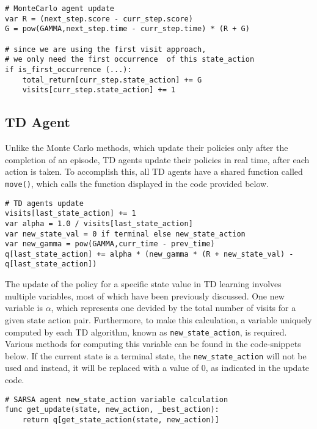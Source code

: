 \begin{center}
\hrulefill
\begin{lstlisting}
# MonteCarlo agent update
var R = (next_step.score - curr_step.score)
G = pow(GAMMA,next_step.time - curr_step.time) * (R + G)
            
# since we are using the first visit approach,
# we only need the first occurrence  of this state_action
if is_first_occurrence (...):
    total_return[curr_step.state_action] += G
    visits[curr_step.state_action] += 1
\end{lstlisting}
\hrulefill
\end{center}

\subsection{TD Agent}	
Unlike the Monte Carlo methods, which update their policies only after the completion of an episode, TD agents update their policies in real time, after each action is taken. To accomplish this, all TD agents have a shared function called \texttt{move()}, which calls the function displayed in the code provided below. 

\begin{center}
\hrulefill
\begin{lstlisting}
# TD agents update
visits[last_state_action] += 1
var alpha = 1.0 / visits[last_state_action]
var new_state_val = 0 if terminal else new_state_action
var new_gamma = pow(GAMMA,curr_time - prev_time)
q[last_state_action] += alpha * (new_gamma * (R + new_state_val) - q[last_state_action])
\end{lstlisting}
\hrulefill
\end{center}

The update of the policy for a specific state value in TD learning involves multiple variables, most of which have been previously discussed. One new variable is $\alpha$, which represents one devided by the total number of visits for a given state action pair. Furthermore, to make this calculation, a variable uniquely computed by each TD algorithm, known as \texttt{new\_state\_action}, is required. Various methods for computing this variable can be found in the code-snippets below. If the current state is a terminal state, the \texttt{new\_state\_action} will not be used and instead, it will be replaced with a value of 0, as indicated in the update code.

\begin{center}
\hrulefill
\begin{lstlisting}
# SARSA agent new_state_action variable calculation
func get_update(state, new_action, _best_action):
    return q[get_state_action(state, new_action)]
\end{lstlisting}
\hrulefill
\end{center}

